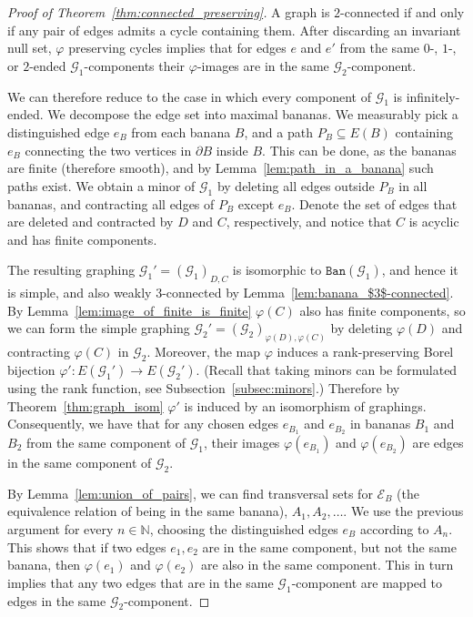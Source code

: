 \documentclass{article}
\theoremstyle{plain}
\theoremstyle{definition}
\newcommand{\N}{\mathbb{N}}
\newcommand{\cG}{\mathcal{G}}
\newcommand{\cE}{\mathcal{E}}
\begin{document}
\begin{proof}[Proof of Theorem~\ref{thm:connected_preserving}] A graph is $2$-connected if and only if any pair of edges admits a cycle containing them. After discarding an invariant null set, $\varphi$ preserving cycles implies that for edges $e$ and $e'$ from the same  $0$-, $1$-, or $2$-ended $\cG_1$-components their $\varphi$-images are in the same $\cG_2$-component.

We can therefore reduce to the case in which every component of $\cG_1$ is infinitely-ended. We decompose the edge set into maximal bananas. We measurably pick a distinguished edge $e_B$ from each banana $B$, and a path $P_B \subseteq E(B)$ containing $e_B$ connecting the two vertices in $\partial B$ inside $B$. This can be done, as the bananas are finite (therefore smooth), and by Lemma~\ref{lem:path_in_a_banana} such paths exist. We obtain a minor of $\cG_1$ by deleting all edges outside $P_B$ in all bananas, and contracting all edges of $P_B$ except $e_B$. Denote the set of edges that are deleted and contracted by $D$ and $C$, respectively, and notice that $C$ is acyclic and has finite components. 

The resulting graphing $\cG_1'=(\cG_1)_{D,C}$ is isomorphic to $\texttt{Ban}(\cG_1)$, and hence it is simple, and also weakly $3$-connected by Lemma~\ref{lem:banana_$3$-connected}. By Lemma~\ref{lem:image_of_finite_is_finite} $\varphi(C)$ also has finite components, so we can form the simple graphing $\cG_2'=(\cG_2)_{\varphi(D),\varphi(C)}$ by deleting $\varphi(D)$ and contracting $\varphi(C)$ in $\cG_2$. Moreover, the map $\varphi$ induces a rank-preserving Borel bijection $\varphi':E(\cG_1') \to E(\cG_2')$. (Recall that taking minors can be formulated using the rank function, see Subsection~\ref{subsec:minors}.) Therefore by Theorem~\ref{thm:graph_isom} $\varphi'$ is induced by an isomorphism of graphings. Consequently, we have that for any chosen edges $e_{B_1}$ and $e_{B_2}$ in bananas $B_1$ and $B_2$ from the same component of $\cG_1$, their images $\varphi(e_{B_1})$ and $\varphi(e_{B_2})$ are edges in the same component of $\cG_2$. 

By Lemma~\ref{lem:union_of_pairs}, we can find transversal sets for $\cE_B$ (the equivalence relation of being in the same banana), $A_1,A_2,\dots$. We use the previous argument for every $n\in\N$, choosing the distinguished edges $e_B$ according to $A_n$. This shows that if two edges $e_1,e_2$ are in the same component, but not the same banana, then $\varphi(e_1)$ and $\varphi(e_2)$ are also in the same component. This in turn implies that any two edges that are in the same $\cG_1$-component are mapped to edges in the same $\cG_2$-component. 
\end{proof}
\end{document}
